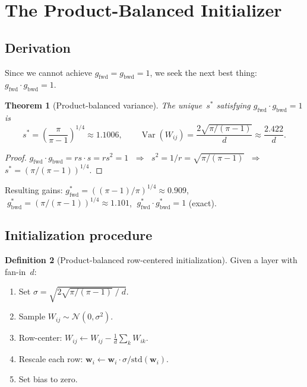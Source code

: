 \documentclass[11pt,a4paper]{article}
\newtheorem{theorem}{Theorem}[section]
\theoremstyle{definition}
\newtheorem{definition}[theorem]{Definition}
\newcommand{\Var}{\operatorname{Var}}
\begin{document}
\section{The Product-Balanced Initializer}
\label{sec:product-balanced}

\subsection{Derivation}
Since we cannot achieve $g_{\mathrm{fwd}} = g_{\mathrm{bwd}} = 1$,
we seek the next best thing: $g_{\mathrm{fwd}} \cdot g_{\mathrm{bwd}} = 1$.

\begin{theorem}[Product-balanced variance]
  \label{thm:product-balanced}
  The unique~$s^{\ast}$ satisfying $g_{\mathrm{fwd}} \cdot g_{\mathrm{bwd}} = 1$ is
  \begin{equation}\label{eq:s-star}
    s^{\ast} = \left(\frac{\pi}{\pi-1}\right)^{\!1/4} \approx 1.1006,
    \qquad
    \Var(W_{ij}) = \frac{2\sqrt{\pi/(\pi-1)}}{d} \approx \frac{2.422}{d}.
  \end{equation}
\end{theorem}
\begin{proof}
  $g_{\mathrm{fwd}} \cdot g_{\mathrm{bwd}} = r s \cdot s = r s^2 = 1$
  $\;\Longrightarrow\;$ $s^2 = 1/r = \sqrt{\pi/(\pi-1)}$
  $\;\Longrightarrow\;$ $s^{\ast} = (\pi/(\pi-1))^{1/4}$.
\end{proof}

Resulting gains: $g_{\mathrm{fwd}}^{\ast} = ((\pi-1)/\pi)^{1/4} \approx 0.909$,
$\;g_{\mathrm{bwd}}^{\ast} = (\pi/(\pi-1))^{1/4} \approx 1.101$,
$\;g_{\mathrm{fwd}}^{\ast} \cdot g_{\mathrm{bwd}}^{\ast} = 1$ (exact).

\subsection{Initialization procedure}
\begin{definition}[Product-balanced row-centered initialization]
\label{def:init-uniform}
Given a layer with fan-in~$d$:
\begin{enumerate}[nosep]
  \item Set $\sigma = \sqrt{2\sqrt{\pi/(\pi-1)} \;/\; d}$.
  \item Sample $W_{ij} \sim \mathcal{N}(0, \sigma^2)$.
  \item Row-center: $W_{ij} \leftarrow W_{ij} - \frac{1}{d}\sum_k W_{ik}$.
  \item Rescale each row: $\bm{w}_i \leftarrow \bm{w}_i \cdot \sigma / \mathrm{std}(\bm{w}_i)$.
  \item Set bias to zero.
\end{enumerate}
\end{definition}
\end{document}
